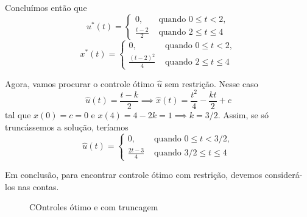 Concluímos então que 
$$
u^*(t) = \begin{cases}
    0, &\text{ quando } 0 \le t < 2, \\ 
    \frac{t-2}{2} &\text{ quando } 2 \le t \le 4
\end{cases}
$$
$$
x^*(t) = \begin{cases}
    0, &\text{ quando } 0 \le t < 2, \\ 
    \frac{(t-2)^2}{4} &\text{ quando } 2 \le t \le 4
\end{cases}
$$

Agora, vamos procurar o controle ótimo $\hat{u}$ sem restrição. Nesse caso 
$$
\hat{u}(t) = \frac{t-k}{2} \implies \hat{x}(t) = \frac{t^2}{4} - \frac{kt}{2}
+ c
$$
tal que $x(0) = c = 0$ e $x(4) = 4 - 2k = 1 \implies k = 3/2$. Assim, se só truncássemos a solução, teríamos 
$$
\hat{u}(t) = \begin{cases}
    0, &\text{ quando } 0 \le t < 3/2, \\ 
    \frac{2t-3}{4} &\text{ quando } 3/2 \le t \le 4
\end{cases}
$$

Em conclusão, para encontrar controle ótimo com restrição, devemos considerá-los nas contas. 

\begin{figure}[!ht]
    \center
    
    \caption{COntroles ótimo e com truncagem}
\end{figure}